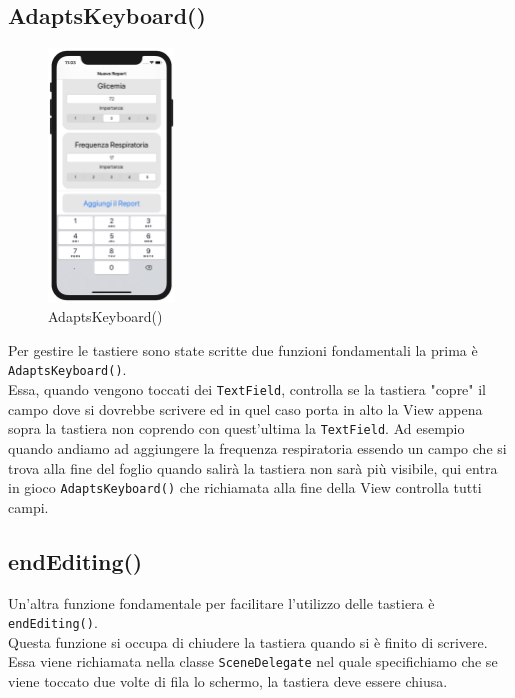 \documentclass{article}
\begin{document}
\subsection{AdaptsKeyboard()}
\begin{figure}
  \begin{center}
    \includegraphics[width=0.3\textwidth]{img/tastiera.png}
  \end{center}
\caption{AdaptsKeyboard()}
\end{figure}
Per gestire le tastiere sono state scritte due funzioni fondamentali la prima è \texttt{AdaptsKeyboard()}.\\
Essa, quando vengono toccati dei \texttt{TextField}, controlla se la tastiera "copre" il campo dove si dovrebbe scrivere ed in quel caso porta in alto la View appena sopra la tastiera non coprendo con quest'ultima la \texttt{TextField}. Ad esempio quando andiamo ad aggiungere la frequenza respiratoria essendo un campo che si trova alla fine del foglio quando salirà la tastiera non sarà più visibile, qui entra in gioco \texttt{AdaptsKeyboard()} che richiamata alla fine della View controlla tutti campi. 

\subsection{endEditing()}

Un'altra funzione fondamentale per facilitare l'utilizzo delle tastiera è \texttt{endEditing()}.\\
Questa funzione si occupa di chiudere la tastiera quando si è finito di scrivere. Essa viene richiamata nella classe \texttt{SceneDelegate} nel quale specifichiamo che se viene toccato due volte di fila lo schermo, la tastiera deve essere chiusa. 
\end{document}
